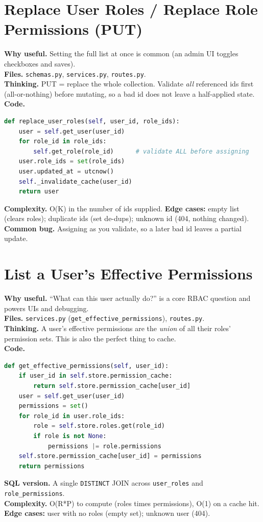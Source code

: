 \documentclass[11pt,a4paper]{report}
\begin{document}
\section{Replace User Roles / Replace Role Permissions (PUT)}
\textbf{Why useful.} Setting the full list at once is common (an admin UI toggles
checkboxes and saves).\\
\textbf{Files.} \texttt{schemas.py}, \texttt{services.py}, \texttt{routes.py}.\\
\textbf{Thinking.} PUT = replace the whole collection. Validate \emph{all}
referenced ids first (all-or-nothing) before mutating, so a bad id does not leave
a half-applied state.\\
\textbf{Code.}
\begin{lstlisting}[language=Python]
def replace_user_roles(self, user_id, role_ids):
    user = self.get_user(user_id)
    for role_id in role_ids:
        self.get_role(role_id)      # validate ALL before assigning
    user.role_ids = set(role_ids)
    user.updated_at = utcnow()
    self._invalidate_cache(user_id)
    return user
\end{lstlisting}
\textbf{Complexity.} O(K) in the number of ids supplied. \textbf{Edge cases:}
empty list (clears roles); duplicate ids (set de-dups); unknown id (404, nothing
changed).\\
\textbf{Common bug.} Assigning as you validate, so a later bad id leaves a
partial update.

\section{List a User's Effective Permissions}
\textbf{Why useful.} ``What can this user actually do?'' is a core RBAC question
and powers UIs and debugging.\\
\textbf{Files.} \texttt{services.py} (\texttt{get\_effective\_permissions}),
\texttt{routes.py}.\\
\textbf{Thinking.} A user's effective permissions are the \emph{union} of all
their roles' permission sets. This is also the perfect thing to cache.\\
\textbf{Code.}
\begin{lstlisting}[language=Python]
def get_effective_permissions(self, user_id):
    if user_id in self.store.permission_cache:
        return self.store.permission_cache[user_id]
    user = self.get_user(user_id)
    permissions = set()
    for role_id in user.role_ids:
        role = self.store.roles.get(role_id)
        if role is not None:
            permissions |= role.permissions
    self.store.permission_cache[user_id] = permissions
    return permissions
\end{lstlisting}
\textbf{SQL version.} A single \texttt{DISTINCT} JOIN across
\texttt{user\_roles} and \texttt{role\_permissions}.\\
\textbf{Complexity.} O(R*P) to compute (roles times permissions), O(1) on a cache
hit. \textbf{Edge cases:} user with no roles (empty set); unknown user (404).
\end{document}
